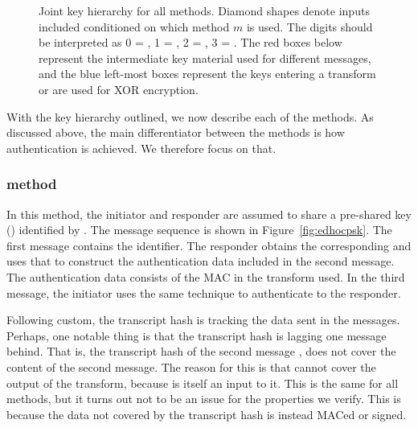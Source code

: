 
\begin{figure}[htp]
\centering
\scalebox{.75}{

}
\caption{Joint key hierarchy for all methods. Diamond shapes denote inputs
included conditioned on which method $m$ is used. The digits should be
interpreted as 0 = \mSigSig, 1 = \mSigStat, 2 = \mStatSig, 3 = \mStatStat.
The red boxes below \mGxy{} represent the intermediate key material used for
different messages, and the blue left-most boxes represent the keys entering
a \mAead{} transform or are used for XOR encryption.}
\label{fig:kdfdiagram}
\end{figure}

With the key hierarchy outlined, we now describe each of the \mEdhoc{} methods.
%
As discussed above, the main differentiator between the methods is how
authentication is achieved.
%
We therefore focus on that.
%

\subsubsection{\mPskPsk{} method}
In this method, the initiator and responder are assumed to share a pre-shared
key (\mPsk) identified by \mIDPsk.
%
The message sequence is shown in Figure~\ref{fig:edhocpsk}.
%
The first message contains the \mIDPsk{} identifier.
%
The responder obtains the corresponding \mPsk{} and uses that to construct the
authentication data included in the second message.
%
The authentication data consists of the MAC in the \mAead{} transform used.
%
In the third message, the initiator uses the same technique to authenticate to
the responder.
%

Following custom, the transcript hash \mTH{} is tracking the data sent in the
messages.
%
Perhaps, one notable thing is that the transcript hash is lagging one message
behind.
%
That is, the transcript hash of the second message \mTHtwo{}, does not cover the
content of the second message.
%
The reason for this is that cannot cover the output of the \mAead{} transform,
because \mTHtwo{} is itself an input to it.
%
This is the same for all methods, but it turns out not to be an issue for the
properties we verify.
%
This is because the data not covered by the transcript hash is instead MACed or
signed.
%

